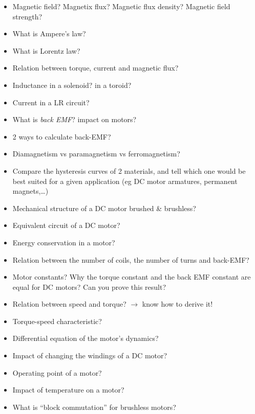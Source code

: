 \documentclass[compress]{beamer}
\begin{document}
\begin{frame}[plain]
    \begin{center}
        \begin{itemize}
        \item Magnetic field? Magnetix flux? Magnetic flux density? Magnetic
            field strength?
        \item {What is Ampere's law?}
        \item {What is Lorentz law?}
        \item Relation between torque, current and magnetic flux?
        \item Inductance in a solenoid? in a toroid?
        \item Current in a LR circuit?
        \item What is \emph{back EMF}? impact on motors?
        \item 2 ways to calculate back-EMF?
        \item {Diamagnetism vs paramagnetism vs ferromagnetism?}
        \item {Compare the hysteresis curves of 2 materials, and tell which one would be best suited for a given application (eg DC motor armatures, permanent magnets,…)}
        \end{itemize}
    \end{center}
\end{frame}

\begin{frame}[plain]
    \begin{center}
        \begin{itemize}
            \item Mechanical structure of a DC motor brushed \& brushless?
        \item {Equivalent circuit of a DC motor?}
        \item Energy conservation in a motor?
        \item {Relation between the number of coils, the number of turns and back-EMF?}
        \item {Motor constants? Why the torque constant and the back EMF constant are equal for DC motors? Can you prove this result?}
        \item {Relation between speed and torque? $\rightarrow$ know how to derive it!}
        \item {Torque-speed characteristic?}
        \item {Differential equation of the motor’s dynamics?}
        \item {Impact of changing the windings of a DC motor?}
        \item {Operating point of a motor?}
        \item {Impact of temperature on a motor?}
        \item {What is “block commutation” for brushless motors?}
        \end{itemize}
    \end{center}
\end{frame}
\end{document}
